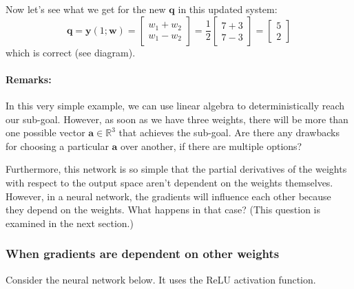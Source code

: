 \documentclass{article}
\let\vec\mathbf
\begin{document}
Now let's see what we get for the new $\vec{q}$ in this updated system:
\begin{equation*}
    \vec{q} =
    \vec{y}(1; \vec{w}) =
    \begin{bmatrix}
        w_1 + w_2 \\
        w_1 - w_2
    \end{bmatrix} = 
    \frac{1}{2}
    \begin{bmatrix}
        7+3 \\
        7-3
    \end{bmatrix}
    =
    \begin{bmatrix}
        5 \\
        2
    \end{bmatrix}
\end{equation*}
which is correct (see diagram).

\paragraph{Remarks:}
In this very simple example, we can use linear algebra to deterministically reach our sub-goal. 
However, as soon as we have three weights, there will be more than one possible vector $\vec{a} \in \mathbb{R}^3$ that achieves the sub-goal. 
Are there any drawbacks for choosing a particular $\vec{a}$ over another, if there are multiple options?

Furthermore, this network is so simple that the partial derivatives of the weights with respect to the output space aren't dependent on the weights themselves. However, in a  neural network, the gradients will influence each other because they depend on the weights. What happens in that case? (This question is examined in the next section.)

\subsubsection{When gradients are dependent on other weights}
Consider the neural network below. It uses the ReLU activation function.

\begin{center}
\end{center}
\end{document}
